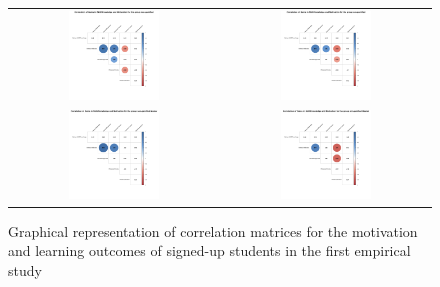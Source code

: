 

\begin{figure}[htb]
 \caption{Graphical representation of correlation matrices for the motivation and learning outcomes of signed-up students in the first empirical study}
 \label{fig:signedup-correlation-matrices-first-study}
 \centering
 \begin{tabular}{cc}
 \includegraphics[width=0.45\textwidth]{images/chap-evaluation/corr-signedup-first/non-gamified1.png}&
 \includegraphics[width=0.45\textwidth]{images/chap-evaluation/corr-signedup-first/ont-gamified1.png}\\
 \includegraphics[width=0.45\textwidth]{images/chap-evaluation/corr-signedup-first/non-gamifiedMaster1.png}&
 \includegraphics[width=0.45\textwidth]{images/chap-evaluation/corr-signedup-first/ont-gamifiedMaster1.png}\\

\end{tabular}
\end{figure}
